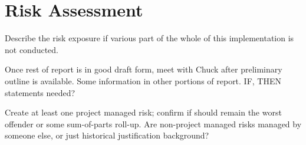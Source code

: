 \section{Risk Assessment}

Describe the risk exposure if various part of the whole of this implementation is not conducted.

Once rest of report is in good draft form, meet with Chuck after preliminary outline is available.
Some information in other portions of report.
IF, THEN statements needed?

Create at least one project managed risk; confirm if should remain the worst offender or some sum-of-parts roll-up.
Are non-project managed risks managed by someone else, or just historical justification background?

